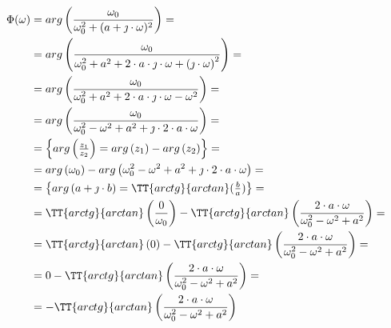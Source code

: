 \begin{task}
\begin{figure}[H]
\end{figure}


\begin{align*}
\Phi ( \omega )&=arg\left( \frac{\omega_{0}}{\omega_{0}^{2} + (a + \jmath \cdot \omega)^{2}} \right)=\\
&=arg\left( \frac{\omega_{0}}{\omega_{0}^{2} + a^2 + 2\cdot a \cdot \jmath \cdot \omega + \left(\jmath \cdot \omega\right)^{2}}\right)=\\
&=arg\left( \frac{\omega_{0}}{\omega_{0}^{2} + a^2 + 2\cdot a \cdot \jmath \cdot \omega - \omega^{2}}\right)=\\
&=arg\left( \frac{\omega_{0}}{\omega_{0}^{2}- \omega^{2} + a^2 + \jmath \cdot 2\cdot a \cdot \omega }\right)=\\
&=\begin{Bmatrix}
arg\left(\frac{z_1}{z_2}\right) = arg\left(z_1\right) -arg\left(z_2\right)
\end{Bmatrix}=\\
&=arg\left( \omega_{0}\right) - arg\left(\omega_{0}^{2}- \omega^{2} + a^2 + \jmath \cdot 2\cdot a \cdot \omega \right)=\\
&=\begin{Bmatrix}
arg\left(a + \jmath \cdot b\right) = \TT{arctg}{arctan}(\frac{b}{a})\\
\end{Bmatrix}=\\
&=\TT{arctg}{arctan}\left(\frac{0}{\omega_0}\right) - \TT{arctg}{arctan}\left(\frac{2\cdot a \cdot \omega}{\omega_0^2-\omega^2+a^2}\right)=\\
&=\TT{arctg}{arctan}\left(0\right) - \TT{arctg}{arctan}\left(\frac{2\cdot a \cdot \omega}{\omega_0^2-\omega^2+a^2}\right)=\\
&=0 - \TT{arctg}{arctan}\left(\frac{2\cdot a \cdot \omega}{\omega_0^2-\omega^2+a^2}\right)=\\
&=- \TT{arctg}{arctan}\left(\frac{2\cdot a \cdot \omega}{\omega_0^2-\omega^2+a^2}\right)
\end{align*}

\begin{figure}[H]
  \centering
\end{figure}
\end{task}
